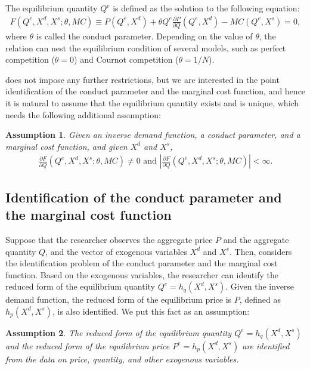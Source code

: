 \documentclass[11pt, a4paper]{article}
\newtheorem{assumption}{Assumption}
\theoremstyle{remark}
\begin{document}
The equilibrium quantity $Q^e$ is defined as the solution to the following equation:
\begin{align}
    F(Q^e, X^{d}, X^{s}; \theta, MC) \equiv P(Q^e, X^{d}) + \theta Q^e\frac{\partial P}{\partial Q}(Q^e, X^{d}) - MC(Q^e, X^{s}) = 0, \label{eq:foc}
\end{align}
where $\theta$ is called the conduct parameter.
Depending on the value of $\theta$, the relation can nest the equilibrium condition of several models, such as perfect competition ($\theta=0$) and Cournot competition ($\theta=1/N$).

\citet{lau1982identifying} does not impose any further restrictions, but we are interested in the point identification of the conduct parameter and the marginal cost function, and hence it is natural to assume that the equilibrium quantity exists and is unique, which needs the following additional assumption:
\begin{assumption}\label{assumption:unique_equilibrium}
    Given an inverse demand function, a conduct parameter, and a marginal cost function, and given $X^{d}$ and $X^{s}$,
    \begin{align}
        \frac{\partial F}{\partial Q}(Q^{e}, X^{d}, X^{s}; \theta, MC) \ne 0 \text{ and } \left| \frac{\partial F}{\partial Q}(Q^{e}, X^{d}, X^{s}; \theta, MC)\right| < \infty. 
    \end{align}
\end{assumption}




\subsection{Identification of the conduct parameter and the marginal cost function}\label{sec:definition_identification}

Suppose that the researcher observes the aggregate price $P$ and the aggregate quantity $Q$, and the vector of exogenous variables $X^{d}$ and $X^{s}$.
Then, \citet{lau1982identifying} considers the identification problem of the conduct parameter and the marginal cost function.
Based on the exogenous variables, the researcher can identify the reduced form of the equilibrium quantity $Q^e = h_q(X^{d}, X^{s})$.
Given the inverse demand function, the reduced form of the equilibrium price is $P$, defined as $h_p(X^{d}, X^{s})$, is also identified.
We put this fact as an assumption:
\begin{assumption}\label{assumption:reduced_form_identification}
    The reduced form of the equilibrium quantity $Q^e = h_q(X^{d}, X^{s})$ and the reduced form of the equilibrium price $P^e = h_p(X^{d}, X^{s})$ are identified from the data on price, quantity, and other exogenous variables.
\end{assumption}
\end{document}
